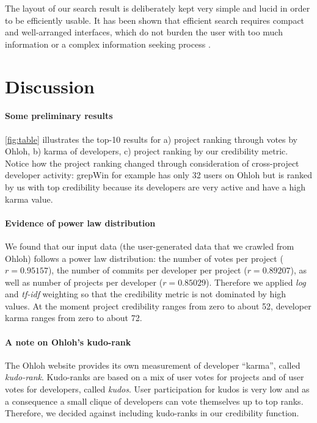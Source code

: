 The layout of our search result is deliberately kept very simple and lucid in order to be efficiently usable. It has been shown that efficient search requires compact and well-arranged interfaces, which do not burden the user with too much information or a complex information seeking process \cite{Hear09a}. 


\section{Discussion}
\label{sec:discussion}

\paragraph{Some preliminary results}
\autoref{fig:table} illustrates the top-10 results for a) project ranking through votes by Ohloh, b) karma of developers, c) project ranking by our credibility metric. Notice how the project ranking changed through consideration of cross-project developer activity: grepWin for example has only 32 users on Ohloh but is ranked by us with top credibility because its developers are very active and have a high karma value.

\paragraph{Evidence of power law distribution} 
We found that our input data (\ie the user-generated data that we crawled from Ohloh) follows a power law distribution: the number of votes per project ($r = 0.95157$), the number of commits per developer per project ($r = 0.89207$), as well as number of projects per developer ($r = 0.85029$). Therefore we applied \emph{log} and \emph{tf-idf} weighting so that the credibility metric is not dominated by high values.
At the moment project credibility ranges from zero to about 52, developer karma ranges from zero to about 72.

\paragraph{A note on Ohloh's kudo-rank}
The Ohloh website provides its own measurement of developer ``karma'', called \emph{kudo-rank}. Kudo-ranks are based on a mix of user votes for projects and of user votes for developers, called \emph{kudos}. User participation for kudos is very low and as a consequence a small clique of developers can vote themselves up to top ranks. Therefore, we decided against including kudo-ranks in our credibility function.

